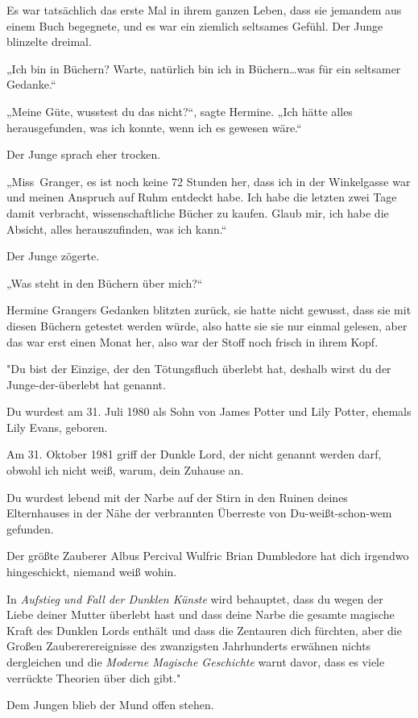 {Es war tatsächlich das erste Mal in ihrem ganzen Leben, dass sie jemandem aus einem Buch begegnete, und es war ein ziemlich seltsames Gefühl. Der Junge blinzelte dreimal.

„Ich bin in Büchern? Warte, natürlich bin ich in Büchern…was für ein seltsamer Gedanke.“

„Meine Güte, wusstest du das nicht?“, sagte Hermine. „Ich hätte alles herausgefunden, was ich konnte, wenn ich es gewesen wäre.“

Der Junge sprach eher trocken.

„Miss~Granger, es ist noch keine 72 Stunden her, dass ich in der Winkelgasse war und meinen Anspruch auf Ruhm entdeckt habe. Ich habe die letzten zwei Tage damit verbracht, wissenschaftliche Bücher zu kaufen. Glaub mir, ich habe die Absicht, alles herauszufinden, was ich kann.“

Der Junge zögerte.

„Was steht in den Büchern über mich?“

Hermine Grangers Gedanken blitzten zurück, sie hatte nicht gewusst, dass sie mit diesen Büchern getestet werden würde, also hatte sie sie nur einmal gelesen, aber das war erst einen Monat her, also war der Stoff noch frisch in ihrem Kopf.

"Du bist der Einzige, der den Tötungsfluch überlebt hat, deshalb wirst du der Junge-der-überlebt hat genannt.

Du wurdest am 31. Juli 1980 als Sohn von James Potter und Lily Potter, ehemals Lily Evans, geboren.

Am 31. Oktober 1981 griff der Dunkle Lord, der nicht genannt werden darf, obwohl ich nicht weiß, warum, dein Zuhause an.

Du wurdest lebend mit der Narbe auf der Stirn in den Ruinen deines Elternhauses in der Nähe der verbrannten Überreste von Du-weißt-schon-wem gefunden.

Der größte Zauberer Albus Percival Wulfric Brian Dumbledore hat dich irgendwo hingeschickt, niemand weiß wohin.

In \emph{Aufstieg und Fall der Dunklen Künste} wird behauptet, dass du wegen der Liebe deiner Mutter überlebt hast und dass deine Narbe die gesamte magische Kraft des Dunklen Lords enthält und dass die Zentauren dich fürchten, aber die Großen Zaubererereignisse des zwanzigsten Jahrhunderts erwähnen nichts dergleichen und die \emph{Moderne Magische Geschichte} warnt davor, dass es viele verrückte Theorien über dich gibt."

Dem Jungen blieb der Mund offen stehen.

}
